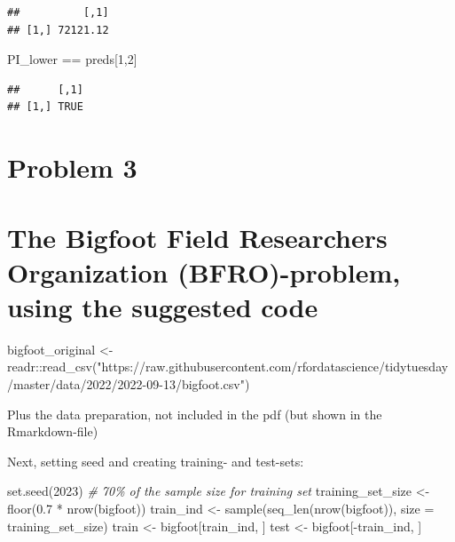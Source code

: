 \documentclass[
]{article}
\newenvironment{Shaded}{\begin{snugshade}}{\end{snugshade}}
\newcommand{\AttributeTok}[1]{\textcolor[rgb]{0.77,0.63,0.00}{#1}}
\newcommand{\CommentTok}[1]{\textcolor[rgb]{0.56,0.35,0.01}{\textit{#1}}}
\newcommand{\DecValTok}[1]{\textcolor[rgb]{0.00,0.00,0.81}{#1}}
\newcommand{\FloatTok}[1]{\textcolor[rgb]{0.00,0.00,0.81}{#1}}
\newcommand{\FunctionTok}[1]{\textcolor[rgb]{0.00,0.00,0.00}{#1}}
\newcommand{\NormalTok}[1]{#1}
\newcommand{\OtherTok}[1]{\textcolor[rgb]{0.56,0.35,0.01}{#1}}
\newcommand{\SpecialCharTok}[1]{\textcolor[rgb]{0.00,0.00,0.00}{#1}}
\newcommand{\StringTok}[1]{\textcolor[rgb]{0.31,0.60,0.02}{#1}}
\begin{document}
\begin{verbatim}
##          [,1]
## [1,] 72121.12
\end{verbatim}

\begin{Shaded}
\begin{Highlighting}[]
\NormalTok{PI\_lower }\SpecialCharTok{==}\NormalTok{ preds[}\DecValTok{1}\NormalTok{,}\DecValTok{2}\NormalTok{]}
\end{Highlighting}
\end{Shaded}

\begin{verbatim}
##      [,1]
## [1,] TRUE
\end{verbatim}

\hypertarget{problem-3}{%
\section{Problem 3}\label{problem-3}}

\hypertarget{the-bigfoot-field-researchers-organization-bfro-problem-using-the-suggested-code}{%
\section{The Bigfoot Field Researchers Organization (BFRO)-problem,
using the suggested
code}\label{the-bigfoot-field-researchers-organization-bfro-problem-using-the-suggested-code}}

\begin{Shaded}
\begin{Highlighting}[]
\NormalTok{bigfoot\_original }\OtherTok{\textless{}{-}}\NormalTok{ readr}\SpecialCharTok{::}\FunctionTok{read\_csv}\NormalTok{(}\StringTok{"https://raw.githubusercontent.com/rfordatascience/tidytuesday/master/data/2022/2022{-}09{-}13/bigfoot.csv"}\NormalTok{)}
\end{Highlighting}
\end{Shaded}

Plus the data preparation, not included in the pdf (but shown in the
Rmarkdown-file)

Next, setting seed and creating training- and test-sets:

\begin{Shaded}
\begin{Highlighting}[]
\FunctionTok{set.seed}\NormalTok{(}\DecValTok{2023}\NormalTok{)}
\CommentTok{\# 70\% of the sample size for training set}
\NormalTok{training\_set\_size }\OtherTok{\textless{}{-}} \FunctionTok{floor}\NormalTok{(}\FloatTok{0.7} \SpecialCharTok{*} \FunctionTok{nrow}\NormalTok{(bigfoot))}
\NormalTok{train\_ind }\OtherTok{\textless{}{-}} \FunctionTok{sample}\NormalTok{(}\FunctionTok{seq\_len}\NormalTok{(}\FunctionTok{nrow}\NormalTok{(bigfoot)), }\AttributeTok{size =}\NormalTok{ training\_set\_size)}
\NormalTok{train }\OtherTok{\textless{}{-}}\NormalTok{ bigfoot[train\_ind, ]}
\NormalTok{test }\OtherTok{\textless{}{-}}\NormalTok{ bigfoot[}\SpecialCharTok{{-}}\NormalTok{train\_ind, ]}
\end{Highlighting}
\end{Shaded}
\end{document}
